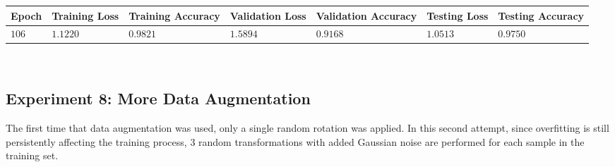 \documentclass[11pt,a4paper]{article}
\begin{document}
\begin{center}
\hspace*{-0.8cm}
\begin{tabular}{|p{1.2cm}|p{1.8cm}|p{2cm}|p{2cm}|p{2cm}|p{2cm}|p{2cm}|}
\rowcolor{gray!50}
\hline
\textbf{Epoch} & \textbf{Training Loss} & \textbf{Training Accuracy} & \textbf{Validation Loss} & \textbf{Validation Accuracy} & \textbf{Testing Loss} & \textbf{Testing Accuracy}\\
\hline
$106$ & $1.1220$ & $0.9821$ & $1.5894$ & $0.9168$ & $1.0513$ & $0.9750$\\
\hline
\end{tabular}\\
\end{center}
\subsection{Experiment 8: More Data Augmentation}
The first time that data augmentation was used, only a single random rotation was applied. In this second attempt, since overfitting is still persistently affecting the training process, $3$ random transformations with added Gaussian noise are performed for each sample in the training set.
\end{document}
